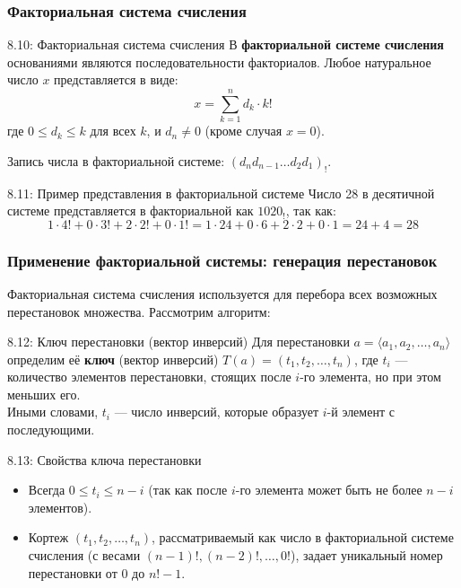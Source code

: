 \documentclass[a4paper,12pt]{article}
\begin{document}
	\subsubsection{Факториальная система счисления}
	
	\begin{definitionbox}{8.10: Факториальная система счисления}
		В \textbf{факториальной системе счисления} основаниями являются последовательности факториалов. Любое натуральное число $x$ представляется в виде:
		\[ x = \sum_{k=1}^n d_k \cdot k! \]
		где $0 \le d_k \le k$ для всех $k$, и $d_n \neq 0$ (кроме случая $x=0$).
		
		Запись числа в факториальной системе: $(d_n d_{n-1} \dots d_2 d_1)_{!}$.
	\end{definitionbox}
	
	\begin{examplebox}{8.11: Пример представления в факториальной системе}
		Число 28 в десятичной системе представляется в факториальной как $1020_{!}$, так как:
		\[ 1 \cdot 4! + 0 \cdot 3! + 2 \cdot 2! + 0 \cdot 1! = 1 \cdot 24 + 0 \cdot 6 + 2 \cdot 2 + 0 \cdot 1 = 24 + 4 = 28 \]
	\end{examplebox}
	
	\subsubsection{Применение факториальной системы: генерация перестановок}
	
	Факториальная система счисления используется для перебора всех возможных перестановок множества. Рассмотрим алгоритм:
	
	\begin{definitionbox}{8.12: Ключ перестановки (вектор инверсий)}
		Для перестановки $a = \langle a_1, a_2, \dots, a_n \rangle$ определим её \textbf{ключ} (вектор инверсий) $T(a) = (t_1, t_2, \dots, t_n)$, где $t_i$ — количество элементов перестановки, стоящих после $i$-го элемента, но при этом меньших его.\\
		
		Иными словами, $t_i$ — число инверсий, которые образует $i$-й элемент с последующими.
	\end{definitionbox}
	
	\begin{importantbox}{8.13: Свойства ключа перестановки}
		\begin{itemize}
			\item Всегда $0 \le t_i \le n-i$ (так как после $i$-го элемента может быть не более $n-i$ элементов).
			\item Кортеж $(t_1, t_2, \dots, t_n)$, рассматриваемый как число в факториальной системе счисления (с весами $(n-1)!, (n-2)!, \dots, 0!$), задает уникальный номер перестановки от $0$ до $n!-1$.
		\end{itemize}
	\end{importantbox}
	
\end{document}
